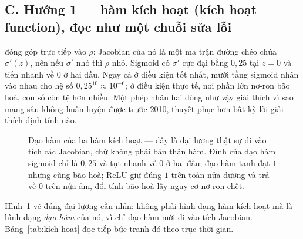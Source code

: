 \documentclass[../../../deep_learning.tex]{subfiles}
\begin{document}
\subsection{C. Hướng 1 --- hàm kích hoạt (kích hoạt function), đọc như một chuỗi sửa lỗi}
 đóng góp trực tiếp vào \(\rho\): Jacobian của nó là một ma trận đường chéo chứa \(\sigma'(z)\), nên nếu \(\sigma'\) nhỏ thì \(\rho\) nhỏ. Sigmoid có \(\sigma'\) cực đại bằng \(0{,}25\) tại \(z = 0\) và tiến nhanh về \(0\) ở hai đầu. Ngay cả ở điều kiện tốt nhất, mười tầng sigmoid nhân vào nhau cho hệ số \(0{,}25^{10} \approx 10^{-6}\); ở điều kiện thực tế, nơi phần lớn nơ-ron bão hoà, con số còn tệ hơn nhiều. Một phép nhân hai dòng như vậy giải thích vì sao mạng sâu không huấn luyện được trước 2010, thuyết phục hơn bất kỳ lời giải thích định tính nào.

\begin{figure}[H]\centering
{}
\caption{Đạo hàm của ba hàm kích hoạt --- đây là đại lượng thật sự đi vào tích các Jacobian, chứ không phải bản thân hàm. Đỉnh của đạo hàm sigmoid chỉ là \(0{,}25\) và tụt nhanh về \(0\) ở hai đầu; đạo hàm tanh đạt \(1\) nhưng cũng bão hoà; ReLU giữ đúng \(1\) trên toàn nửa dương và trả về \(0\) trên nửa âm, đổi tính bão hoà lấy nguy cơ nơ-ron chết.}
\label{fig:dao-ham-kich-hoat}
\end{figure}

Hình~\ref{fig:dao-ham-kich-hoat} vẽ đúng đại lượng cần nhìn: không phải hình dạng hàm kích hoạt mà là hình dạng \emph{đạo hàm} của nó, vì chỉ đạo hàm mới đi vào tích Jacobian. Bảng~\ref{tab:kích hoạt} đọc tiếp bức tranh đó theo trục thời gian.
\end{document}

